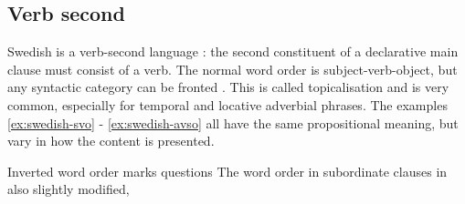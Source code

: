 \documentclass{report}
\begin{document}
\subsection*{Verb second}
Swedish is a verb-second language \cite[p.116]{gunlog}: the
second constituent of a declarative main clause must consist of a verb.
The normal word order is subject-verb-object, but any syntactic category can be
fronted \cite[]{H&H}.
This is called topicalisation and is very common, especially for temporal and
locative adverbial phrases.
The examples \ref{ex:swedish-svo} - \ref{ex:swedish-avso} all have the same propositional
meaning, but vary in how the content is presented.
 \label{ex:swedish-svo}
\vspace{-3mm}
\label{ex:swedish-ovs} 
\vspace{-3mm}
 \label{ex:swedish-avso}


Inverted word order marks questions
The word order in subordinate clauses in also slightly modified,
\end{document}
